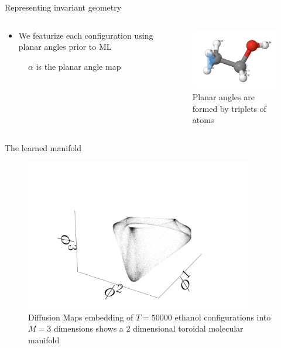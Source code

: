 \begin{frame}[fragile]{Representing invariant geometry}
\begin{columns}
\begin{column}{0.5\textwidth}
\begin{itemize}
    \item We featurize each configuration using planar angles prior to ML \parencite{chen2019modern}
\end{itemize}
\begin{figure}
\caption*{$\alpha$ is the planar angle map}
\end{figure}
\end{column}
\begin{column}{0.4\textwidth}
\begin{figure}
    \includegraphics[width=4cm]{img/planar.png}
    \caption*{Planar angles are formed by triplets of atoms}
\end{figure}
\end{column}
\end{columns}
\end{frame}

\begin{frame}[fragile]{The learned manifold}
\vspace{-2cm}
\begin{figure}
    \includegraphics[width=10cm]{img/ethanol_embedding.png}
    \caption*{Diffusion Maps embedding of $T = 50000$ ethanol configurations into $M=3$ dimensions shows a $2$ dimensional toroidal molecular manifold}
\end{figure}
\end{frame}

